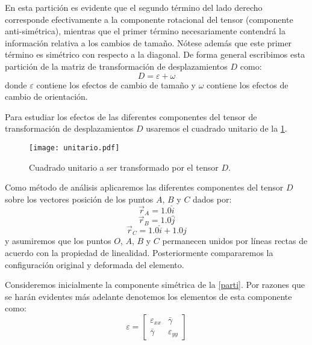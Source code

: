 \documentclass[../notas medios.tex]{subfiles}
\begin{document}
En esta partición es evidente que el segundo término del lado derecho 
corresponde efectivamente a la componente rotacional del tensor (componente 
anti-simétrica), mientras que el primer término necesariamente contendrá la 
información relativa a los cambios de tamaño. Nótese además que este primer 
término es simétrico con respecto a la diagonal. De forma general escribimos 
esta partición de la matriz de transformación de desplazamientos $D$ como:
\begin{equation}
D = \varepsilon  + \omega
\label{parti}
\end{equation}
donde $\varepsilon$ contiene los efectos de cambio de tamaño y $\omega$ contiene los efectos de cambio de orientación.

Para estudiar los efectos de las diferentes componentes del tensor de transformación de desplazamientos $D$ usaremos el cuadrado unitario de la \cref{unitario}.

\begin{figure}[H]
\centering
	\texttt{[image: unitario.pdf]}
	\caption{Cuadrado unitario a ser transformado por el tensor $D$.}
	\label{unitario}
\end{figure}

Como método de análisis aplicaremos las diferentes componentes del tensor $D$ 
sobre los vectores posición de los puntos $A$, $B$ y $C$ dados por:
\[{{\vec r}_A} = 1.0\hat i\]
\[{{\vec r}_B} = 1.0\hat j\]
\[{{\vec r}_C} = 1.0\hat i + 1.0\hat j\]
y asumiremos que los puntos $O$, $A$, $B$ y $C$ permanecen unidos por líneas rectas de acuerdo con la propiedad de linealidad. Posteriormente compararemos la configuración original y deformada del elemento.

Consideremos inicialmente la componente simétrica de la \cref{parti}. Por 
razones que se harán evidentes más adelante denotemos los elementos de esta 
componente como:
\[\varepsilon  = \begin{bmatrix}
\varepsilon_{xx} &\bar{\gamma} \\
\bar{\gamma} &\varepsilon_{yy}
\end{bmatrix}\]
\end{document}
